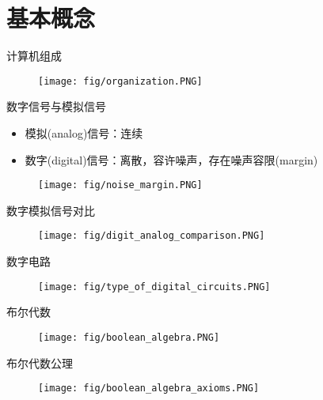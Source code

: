 \section{基本概念}
\begin{frame}
\sectionpage
\end{frame}

\begin{frame}{计算机组成}
\begin{figure}
\centering
\texttt{[image: fig/organization.PNG]}
\end{figure}
\end{frame}

\begin{frame}{数字信号与模拟信号}
\begin{itemize}
	\item 模拟(analog)信号：连续
	\item 数字(digital)信号：离散，容许噪声，存在噪声容限(margin)
\end{itemize}
\begin{figure}
\centering
\texttt{[image: fig/noise\_margin.PNG]}
\end{figure}
\end{frame}

\begin{frame}{数字模拟信号对比}
\begin{figure}
\centering
\texttt{[image: fig/digit\_analog\_comparison.PNG]}
\end{figure}
\end{frame}

\begin{frame}{数字电路}
\begin{figure}
\centering
\texttt{[image: fig/type\_of\_digital\_circuits.PNG]}
\end{figure}
\end{frame}

\begin{frame}{布尔代数}
\begin{figure}
\centering
\texttt{[image: fig/boolean\_algebra.PNG]}
\end{figure}
\end{frame}

\begin{frame}{布尔代数公理}
\begin{figure}
\centering
\texttt{[image: fig/boolean\_algebra\_axioms.PNG]}
\end{figure}
\end{frame}

